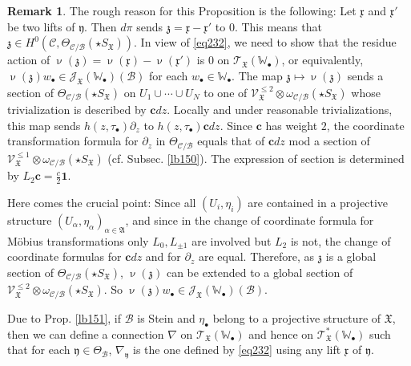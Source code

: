 \documentclass[12pt,a4paper,notitlepage]{article}
\theoremstyle{definition}
\newtheorem{rem}[df]{Remark}
\theoremstyle{plain}
\newcommand{\fk}{\mathfrak}
\newcommand{\mc}{\mathcal}
\newcommand{\id}{\mathbf{1}}
\newcommand{\scr}{\mathscr}
\newcommand{\xk}{\mathfrak x}
\newcommand{\yk}{\mathfrak y}
\newcommand{\zk}{\mathfrak z}
\newcommand{\SX}{{S_{\fk X}}}
\newcommand{\blt}{\bullet}
\newcommand{\Wbb}{\mathbb W}
\newcommand{\cbf}{\mathbf c}
\numberwithin{equation}{section}
\begin{document}
\begin{rem}
The rough reason for this Proposition is the following: Let $\xk$ and $\xk'$ be two lifts of $\yk$. Then $d\pi$ sends $\zk=\xk-\xk'$ to $0$. This means that $\zk\in H^0(\mc C,\Theta_{\mc C/\mc B}(\star\SX))$. In view of \eqref{eq232}, we need to show that the residue action of $\upnu(\zk)=\upnu(\xk)-\upnu(\xk')$ is $0$ on $\scr T_{\fk X}(\Wbb_\blt)$, or equivalently, $\upnu(\zk)w_\blt\in\scr J_{\fk X}(\Wbb_\blt)(\mc B)$ for each $w_\blt\in\Wbb_\blt$. The map $\zk\mapsto \upnu(\zk)$ sends a section of $\Theta_{\mc C/\mc B}(\star\SX)$ on $U_1\cup\cdots\cup U_N$ to one of $\scr V_{\fk X}^{\leq 2}\otimes\omega_{\mc C/\mc B}(\star\SX)$ whose trivialization is described by  $\cbf dz$. Locally and under reasonable trivializations, this map sends $h(z,\tau_\blt)\partial_z$ to $h(z,\tau_\blt)\cbf dz$. Since $\cbf$ has weight $2$, the coordinate transformation formula for $\partial_z$ in $\Theta_{\mc C/\mc B}$ equals that of $\cbf dz$ mod a section of $\scr V_{\fk X}^{\leq 1}\otimes\omega_{\mc C/\mc B}(\star\SX)$ (cf. Subsec. \ref{lb150}).  The expression of section is determined by $L_2\cbf=\frac c{2}\id$.

Here comes the crucial point: Since all $(U_i,\eta_i)$ are contained in a projective structure $(U_\alpha,\eta_\alpha)_{\alpha\in\fk A}$, and since in the change of coordinate formula for M\"obius transformations only $L_0,L_{\pm1}$ are involved but $L_2$ is not, the change of coordinate formulas for $\cbf dz$ and for $\partial_z$ are equal. Therefore, as $\zk$ is a global section of $\Theta_{\mc C/\mc B}(\star\SX)$, $\upnu(\zk)$ can be extended to a global section of $\scr V_{\fk X}^{\leq 2}\otimes\omega_{\mc C/\mc B}(\star\SX)$. So $\upnu(\zk)w_\blt\in\scr J_{\fk X}(\Wbb_\blt)(\mc B)$. \hfill\qedsymbol
\end{rem}



Due to Prop. \ref{lb151}, if $\mc B$ is Stein and $\eta_\blt$ belong to a projective structure of $\fk X$, then we can define a connection $\nabla$ on $\scr T_{\fk X}(\Wbb_\blt)$ and hence on $\scr T_{\fk X}^*(\Wbb_\blt)$ such that for each $\yk\in\Theta_{\mc B}$, $\nabla_\yk$ is the one defined by \eqref{eq232} using any lift $\xk$ of $\yk$.
\end{document}
